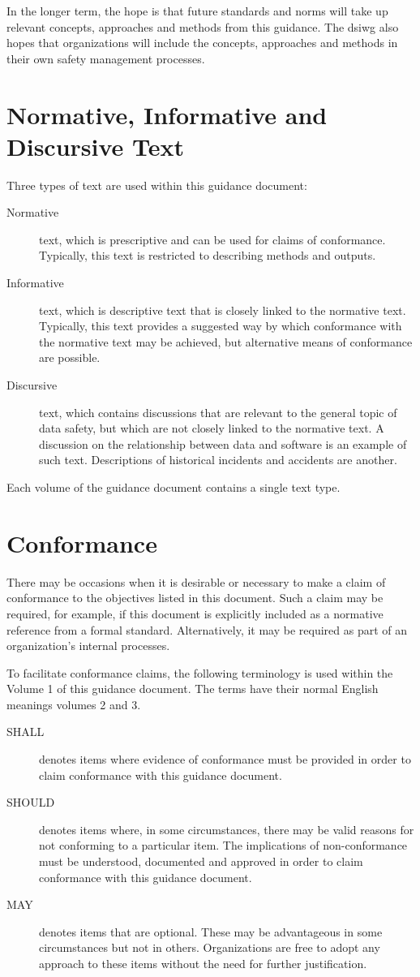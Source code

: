 In the longer term, the hope is that future standards and norms will take up relevant concepts, approaches and methods from this guidance. The \gls{dsiwg} also hopes that organizations will include the concepts, approaches and methods in their own safety management processes.

\section{Normative, Informative and Discursive Text}
Three types of text are used within this guidance document:
\begin{description}
	\item[Normative] text, which is prescriptive and can be used for claims of conformance. Typically, this text is restricted to describing methods and outputs.
	\item[Informative] text, which is descriptive text that is closely linked to the normative text. Typically, this text provides a suggested way by which conformance with the normative text may be achieved, but alternative means of conformance are possible.
	\item[Discursive] text, which contains discussions that are relevant to the general topic of data safety, but which are not closely linked to the normative text. A discussion on the relationship between data and software is an example of such text. Descriptions of historical incidents and accidents are another.
\end{description}

Each volume of the guidance document contains a single text type.

\section{Conformance}
There may be occasions when it is desirable or necessary to make a claim of conformance to the objectives listed in this document. Such a claim may be required, for example, if this document is explicitly included as a normative reference from a formal standard. Alternatively, it may be required as part of an organization's internal processes.

To facilitate conformance claims, the following terminology is used within the Volume 1 of this guidance document. The terms have their normal English meanings volumes 2 and 3.
\begin{description}
	\item[SHALL] denotes items where evidence of conformance must be provided in order to claim conformance with this guidance document.
	\item[SHOULD] denotes items where, in some circumstances, there may be valid reasons for not conforming to a particular item. The implications of non-conformance must be understood, documented and approved in order to claim conformance with this guidance document.
	\item[MAY] denotes items that are optional. These may be advantageous in some circumstances but not in others. Organizations are free to adopt any approach to these items without the need for further justification.
\end{description}


